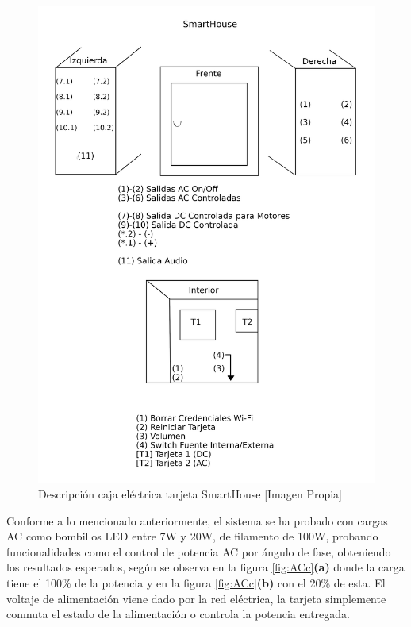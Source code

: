 \begin{figure}[!t]
	\centering
	\caption{Descripción caja eléctrica tarjeta SmartHouse [Imagen Propia]}
	\label{fig:labels}
	\includegraphics[width=0.7\linewidth]{Imagenes/labels}
\end{figure}

Conforme a lo mencionado anteriormente, el sistema se ha probado con cargas AC como bombillos LED entre 7W y 20W, de filamento de 100W, probando funcionalidades como el control de potencia AC por ángulo de fase, obteniendo los resultados esperados, según se observa en la figura \ref{fig:ACc}\textbf{(a)} donde la carga tiene el 100\% de la potencia y en la figura \ref{fig:ACc}\textbf{(b)} con el 20\% de esta. El voltaje de alimentación viene dado por la red eléctrica, la tarjeta simplemente conmuta el estado de la alimentación o controla la potencia entregada. \\

